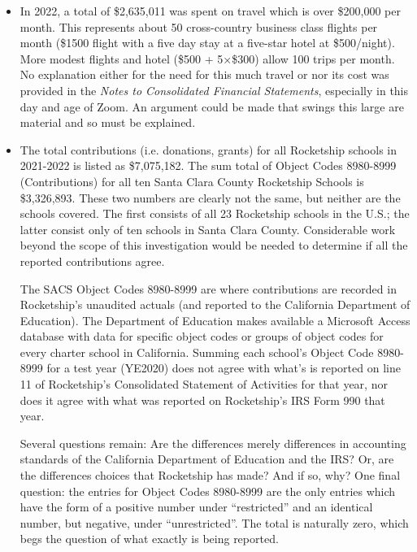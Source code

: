 \begin{itemize}
  \item In 2022, a total of \$2,635,011 was spent on travel which is over \$200,000 per month. This represents about 50 cross-country business class flights per month (\$1500 flight with a five day stay at a five-star hotel at \$500/night).  More modest flights and hotel (\$500 + 5×\$300) allow 100 trips per month.  No explanation either for the need for this much travel or nor its cost was provided in the \textit{Notes to Consolidated Financial Statements}, especially in this day and age of Zoom. An argument could be made that swings this large are material and so must be explained.

  \item The total contributions (i.e. donations, grants) for all Rocketship schools in 2021-2022 is listed as \$7,075,182. The sum total of Object Codes 8980-8999 (Contributions) for all ten Santa Clara County Rocketship Schools is \$3,326,893. These two numbers are clearly not the same, but neither are the schools covered. The first consists of all 23 Rocketship schools in the U.S.; the latter consist only of ten schools in Santa Clara County. Considerable work beyond the scope of this investigation would be needed to determine if all the reported contributions agree.

  The SACS Object Codes 8980-8999 are where contributions are recorded in Rocketship's unaudited actuals (and reported to the California Department of Education). The Department of Education makes available a Microsoft Access database with data for specific object codes or groups of object codes for every charter school in California. Summing each school's Object Code 8980-8999 for a test year (YE2020) does not agree with what's is reported on line 11 of Rocketship's Consolidated Statement of Activities for that year, nor does it agree with what was reported on Rocketship's IRS Form 990 that year.

  Several questions remain: Are the differences merely differences in accounting standards of the California Department of Education and the IRS? Or, are the differences choices that Rocketship has made? And if so, why? One final question: the entries for Object Codes 8980-8999 are the only entries which have the form of a positive number under ``restricted'' and an identical number, but negative, under ``unrestricted''. The total is naturally zero, which begs the question of what exactly is being reported.
  
\end{itemize}

